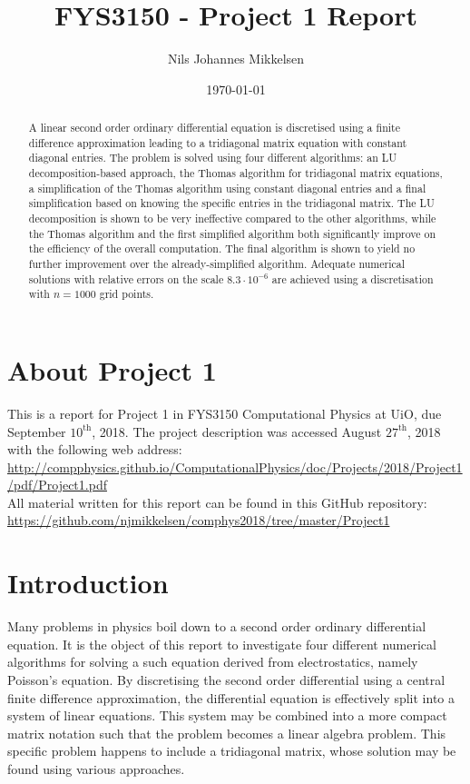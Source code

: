 \documentclass[reprint,english]{revtex4-1}
\begin{document}
\title{FYS3150 - Project 1 Report}
\author{Nils Johannes Mikkelsen}
\date{\today}
\noaffiliation
\begin{abstract}
A linear second order ordinary differential equation is discretised using a finite difference approximation leading to a tridiagonal matrix equation with constant diagonal entries. The problem is solved using four different algorithms: an LU decomposition-based approach, the Thomas algorithm for tridiagonal matrix equations, a simplification of the Thomas algorithm using constant diagonal entries and a final simplification based on knowing the specific entries in the tridiagonal matrix. The LU decomposition is shown to be very ineffective compared to the other algorithms, while the Thomas algorithm and the first simplified algorithm both significantly improve on the efficiency of the overall computation. The final algorithm is shown to yield no further improvement over the already-simplified algorithm. Adequate numerical solutions with relative errors on the scale \(8.3\cdot10^{-6}\) are achieved using a discretisation with \(n=1000\) grid points.
\end{abstract}
\maketitle

\section*{About Project 1}
This is a report for Project 1 in FYS3150 Computational Physics at UiO, due September \(10^{\text{th}}\), 2018. \cite{project1} The project description was accessed August \(27^{\text{th}}\), 2018 with the following web address:\\
{\scriptsize\url{http://compphysics.github.io/ComputationalPhysics/doc/Projects/2018/Project1/pdf/Project1.pdf}}\\
All material written for this report can be found in this GitHub repository:\\
{\scriptsize\url{https://github.com/njmikkelsen/comphys2018/tree/master/Project1}}
\section{Introduction}
Many problems in physics boil down to a second order ordinary differential equation. It is the object of this report to investigate four different numerical algorithms for solving a such equation derived from electrostatics, namely Poisson's equation. By discretising the second order differential using a central finite difference approximation, the differential equation is effectively split into a system of linear equations. This system may be combined into a more compact matrix notation such that the problem becomes a linear algebra problem. This specific problem happens to include a tridiagonal matrix, whose solution may be found using various approaches.
\end{document}
